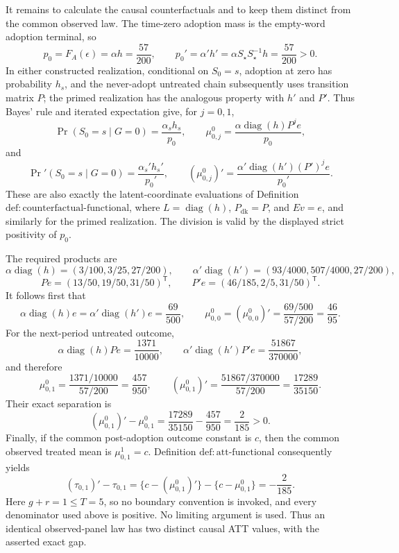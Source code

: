It remains to calculate the causal counterfactuals and to keep them distinct from the common observed law.  The time-zero adoption mass is the empty-word adoption terminal, so
\[
 p_0=F_A(\epsilon)=\alpha h=\frac{57}{200},
 \qquad
 p_0'=\alpha'h'=\alpha S_{\star}S_{\star}^{-1}h
 =\frac{57}{200}>0.
\]
In either constructed realization, conditional on \(S_0=s\), adoption at zero has probability \(h_s\), and the never-adopt untreated chain subsequently uses transition matrix \(P\); the primed realization has the analogous property with \(h'\) and \(P'\).  Thus Bayes' rule and iterated expectation give, for \(j=0,1\),
\[
 \Pr(S_0=s\mid G=0)=\frac{\alpha_sh_s}{p_0},
 \qquad
 \mu^0_{0,j}=\frac{\alpha\operatorname{diag}(h)P^je}{p_0},
\]
and
\[
 \Pr'(S_0=s\mid G=0)=\frac{\alpha_s'h_s'}{p_0'},
 \qquad
 (\mu^0_{0,j})'=\frac{\alpha'\operatorname{diag}(h')(P')^je}{p_0'}.
\]
These are also exactly the latent-coordinate evaluations of Definition \(\mathrm{def{:}counterfactual\text{-}functional}\), where \(L=\operatorname{diag}(h)\), \(P_{\mathrm{dk}}=P\), and \(E v=e\), and similarly for the primed realization.  The division is valid by the displayed strict positivity of \(p_0\).

The required products are
\[
 \alpha\operatorname{diag}(h)
 =(3/100,3/25,27/200),
 \qquad
 \alpha'\operatorname{diag}(h')
 =(93/4000,507/4000,27/200),
\]
\[
 Pe=(13/50,19/50,31/50)^{\mathsf T},
 \qquad
 P'e=(46/185,2/5,31/50)^{\mathsf T}.
\]
It follows first that
\[
 \alpha\operatorname{diag}(h)e
 =\alpha'\operatorname{diag}(h')e
 =\frac{69}{500},
 \qquad
 \mu^0_{0,0}=(\mu^0_{0,0})'
 =\frac{69/500}{57/200}=\frac{46}{95}.
\]
For the next-period untreated outcome,
\[
 \alpha\operatorname{diag}(h)Pe=\frac{1371}{10000},
 \qquad
 \alpha'\operatorname{diag}(h')P'e=\frac{51867}{370000},
\]
and therefore
\[
 \mu^0_{0,1}=\frac{1371/10000}{57/200}=\frac{457}{950},
 \qquad
 (\mu^0_{0,1})'=\frac{51867/370000}{57/200}
 =\frac{17289}{35150}.
\]
Their exact separation is
\[
 (\mu^0_{0,1})'-\mu^0_{0,1}
 =\frac{17289}{35150}-\frac{457}{950}
 =\frac{2}{185}>0.
\]
Finally, if the common post-adoption outcome constant is \(c\), then the common observed treated mean is \(\mu^1_{0,1}=c\).  Definition \(\mathrm{def{:}att\text{-}functional}\) consequently yields
\[
 (\tau_{0,1})'-\tau_{0,1}
 =\{c-(\mu^0_{0,1})'\}-\{c-\mu^0_{0,1}\}
 =-\frac{2}{185}.
\]
Here \(g+r=1\le T=5\), so no boundary convention is invoked, and every denominator used above is positive.  No limiting argument is used.  Thus an identical observed-panel law has two distinct causal ATT values, with the asserted exact gap.
